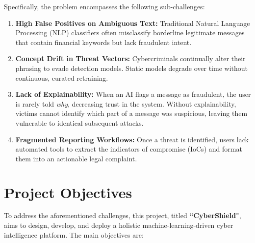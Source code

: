Specifically, the problem encompasses the following sub-challenges:
\begin{enumerate}
    \item \textbf{High False Positives on Ambiguous Text:} Traditional Natural Language Processing (NLP) classifiers often misclassify borderline legitimate messages that contain financial keywords but lack fraudulent intent.
    \item \textbf{Concept Drift in Threat Vectors:} Cybercriminals continually alter their phrasing to evade detection models. Static models degrade over time without continuous, curated retraining.
    \item \textbf{Lack of Explainability:} When an AI flags a message as fraudulent, the user is rarely told \textit{why}, decreasing trust in the system. Without explainability, victims cannot identify which part of a message was suspicious, leaving them vulnerable to identical subsequent attacks.
    \item \textbf{Fragmented Reporting Workflows:} Once a threat is identified, users lack automated tools to extract the indicators of compromise (IoCs) and format them into an actionable legal complaint.
\end{enumerate}

\section{Project Objectives}
To address the aforementioned challenges, this project, titled \textbf{``CyberShield"}, aims to design, develop, and deploy a holistic machine-learning-driven cyber intelligence platform. The main objectives are:

